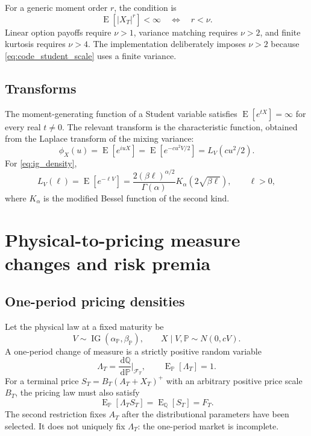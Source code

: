 \documentclass[11pt,a4paper]{article}
\DeclareMathOperator{\IG}{IG}
\DeclareMathOperator{\E}{E}
\newcommand{\dd}{\,\mathrm{d}}
\begin{document}
For a generic moment order $r$, the condition is
\begin{equation}
  \E[|X_T|^r]<\infty\quad\Longleftrightarrow\quad r<\nu.
  \label{eq:student_moment_condition}
\end{equation}
Linear option payoffs require $\nu>1$, variance matching requires $\nu>2$,
and finite kurtosis requires $\nu>4$.  The implementation deliberately imposes
$\nu>2$ because \eqref{eq:code_student_scale} uses a finite variance.

\subsection{Transforms}

The moment-generating function of a Student variable satisfies
$\E[e^{tX}]=\infty$ for every real $t\ne0$.  The relevant transform is the characteristic
function, obtained from the Laplace transform of the mixing variance:
\begin{equation}
  \phi_X(u)=\E[e^{iuX}]=\E[e^{-cu^2V/2}]
  =L_V(cu^2/2).
\end{equation}
For \eqref{eq:ig_density},
\begin{equation}
  L_V(\ell)=\E[e^{-\ell V}]
  =\frac{2(\beta \ell)^{\alpha/2}}{\Gamma(\alpha)}
  K_\alpha(2\sqrt{\beta \ell}),\qquad \ell>0,
  \label{eq:ig_laplace}
\end{equation}
where $K_\alpha$ is the modified Bessel function of the second kind.

\section{Physical-to-pricing measure changes and risk premia}
\label{sec:risk_premia}

\subsection{One-period pricing densities}

Let the physical law at a fixed maturity be
\begin{equation}
  V\sim\IG(\alpha_{\mathbb P},\beta_{\mathbb P}),\qquad
  X\mid V,\mathbb P\sim N(0,cV).
  \label{eq:physical_joint_law}
\end{equation}
A one-period change of measure is a strictly positive random variable
\begin{equation}
  \Lambda_T=\frac{\dd\mathbb Q}{\dd\mathbb P}\bigg|_{\mathcal F_T},
  \qquad
  \E_{\mathbb P}[\Lambda_T]=1.
  \label{eq:terminal_rn_density}
\end{equation}
For a terminal price $S_T=B_T(A_T+X_T)^+$ with an arbitrary positive price
scale $B_T$, the pricing law must also satisfy
\begin{equation}
  \E_{\mathbb P}[\Lambda_TS_T]
  =\E_{\mathbb Q}[S_T]=F_T.
  \label{eq:pricing_measure_martingale}
\end{equation}
The second restriction fixes $A_T$ after the distributional parameters have
been selected.  It does not uniquely fix $\Lambda_T$: the one-period market is
incomplete.
\end{document}

